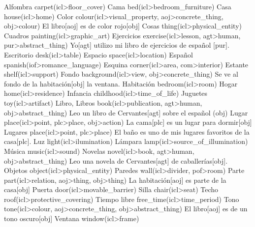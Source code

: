 \documentclass{article}
\begin{document}
{
    \uw
    {Alfombra}
    {carpet(icl>floor\_cover)}
    {}
    \uw
    {Cama}
    {bed(icl>bedroom\_furniture)}
    {}
    \uw
    {Casa}
    {house(icl>home)}
    {}
    \uw
    {Color}
    {colour(icl>visual\_property, aoj>concrete\_thing, obj>colour)}
    {El libro[aoj] es de color rojo[obj]}
    \uw
    {Cosas}
    {thing(icl>physical\_entity)}
    {}
    \uw
    {Cuadros}
    {painting(icl>graphic\_art)}
    {}
    \uw
    {Ejercicios}
    {exercise(icl>lesson, agt>human, pur>abstract\_thing)}
    {Yo[agt] utilizo mi libro de ejercicios de español [pur].}
    \uw
    {Escritorio}
    {desk(icl>table)}
    {}
    \uw
    {Espacio}
    {space(icl>location)}
    {}
    \uw
    {Español}
    {spanish(iof>romance\_language)}
    {}
    \uw
    {Esquina}
    {corner(icl>area, com>interior)}
    {}
    \uw
    {Estante}
    {shelf(icl>support)}
    {}
    \uw
    {Fondo}
    {background(icl>view, obj>concrete\_thing)}
    {Se ve al fondo de la habitación[obj] la ventana.}
    \uw
    {Habitación}
    {bedroom(icl>room)}
    {}
    \uw
    {Hogar}
    {home(icl>residence)}
    {}
    \uw
    {Infancia}
    {childhood(icl>time\_of\_life)}
    {}
    \uw
    {Juguetes}
    {toy(icl>artifact)}
    {}
    \uw
    {Libro, Libros}
    {book(icl>publication, agt>human, obj>abstract\_thing)}
    {Leo un libro de Cervantes[agt] sobre el español (obj)}
    \uw
    {Lugar}
    {place(icl>point, plc>place, obj>action)}
    {La cama[plc] es un lugar para dormir[obj]}
    \uw
    {Lugares}
    {place(icl>point, plc>place)}
    {El baño es uno de mis lugares favoritos de la casa[plc].}
    \uw
    {Luz}
    {light(icl>ilumination)}
    {}
    \uw
    {Lámpara}
    {lamp(icl>source\_of\_illumination)}
    {}
    \uw
    {Música}
    {music(icl>sound)}
    {}
    \uw
    {Novelas}
    {novel(icl>book, agt>human, obj>abstract\_thing)}
    {Leo una novela de Cervantes[agt] de caballerías[obj].}
    \uw
    {Objetos}
    {object(icl>physical\_entity)}
    {}
    \uw
    {Paredes}
    {wall(icl>divider, pof>room)}
    {}
    \uw
    {Parte}
    {part(icl>relation, aoj>thing, obj>thing)}
    {La habitación[aoj] es parte de la casa[obj]}
    \uw
    {Puerta}
    {door(icl>movable\_barrier)}
    {}
    \uw
    {Silla}
    {chair(icl>seat)}
    {}
    \uw
    {Techo}
    {roof(icl>protective\_covering)}
    {}
    \uw
    {Tiempo libre}
    {free\_time(icl>time\_period)}
    {}
    \uw
    {Tono}
    {tone(icl>colour, aoj>concrete\_thing, obj>abstract\_thing)}
    {El libro[aoj] es de un tono oscuro[obj] }
    \uw
    {Ventana}
    {window(icl>frame)}
    {}
}
\end{document}
